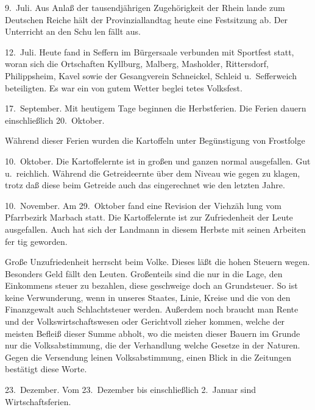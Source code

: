 

9.\ Juli.     Aus Anlaß der tausendjährigen Zugehörigkeit der Rhein\ohb
lande zum Deutschen Reiche hält der Provinziallandtag\ob
heute eine Festsitzung ab. Der Unterricht an den Schu\ohb
len fällt aus.

12.\ Juli.    Heute fand in Seffern im Bürgersaale verbunden mit\ob
Sportfest statt, woran sich die Ortschaften Kyllburg,\ob
Malberg, Masholder, Rittersdorf, Philippsheim, Kavel\unsicher{} sowie\ob
der Gesangverein Schneickel, Schleid u.\ Sefferweich\ob
beteiligten. Es war ein von gutem Wetter beglei\ohb
tetes Volksfest.

17.\ September. Mit heutigem Tage beginnen die Herbstferien.\ob
Die Ferien dauern einschließlich 20.\ Oktober.

Während dieser Ferien wurden die Kartoffeln\ob
unter Begünstigung\unsicher{} von Frostfolge\unsicher

10.\ Oktober. Die Kartoffelernte ist in großen und ganzen normal\ob
ausgefallen. Gut u.\ reichlich. Während die Getreideernte\ob
über dem\unsicher{} Niveau\unsicher{} wie gegen zu\ob
klagen, trotz daß diese beim Getreide auch\unsicher{} das\ob
\unsicher eingerechnet wie den letzten Jahre.

10.\ November. Am 29.\ Oktober fand eine Revision der Viehzäh\ohb
lung vom Pfarrbezirk Marbach statt.\ob
Die Kartoffelernte ist zur Zufriedenheit der Leute\ob
ausgefallen. Auch hat sich der Landmann\ob
in diesem Herbste\unsicher{} mit seinen Arbeiten fer\ohb
tig geworden.

Große Unzufriedenheit herrscht beim Volke. Dieses\ob
läßt die hohen Steuern wegen. Besonders Geld fällt den Leuten.\ob
Großenteils sind die nur in die Lage, den Einkommens\ohb
steuer zu bezahlen, diese geschweige doch an Grundsteuer.\ob
So ist keine Verwunderung, wenn in\unsicher{} unseres\ob
Staates, Linie, Kreise und die von den Finanzgewalt\ohb
auch Schlachtsteuer werden. Außerdem noch braucht man\ob
Rente und der Volkswirtschaftswesen oder Gerichtvoll\ohb
zieher kommen, welche der meisten Befleiß dieser\ob
Summe abholt, wo die meisten dieser Bauern im\ob
Grunde nur die Volksabstimmung, die der Verhandlung\ob
welche Gesetze in der Naturen. Gegen die Versendung\ob
leinen Volksabstimmung, einen Blick in die Zeitungen\ob
bestätigt diese Worte.

23.\ Dezember. Vom 23.\ Dezember bis einschließlich 2.\ Januar\ob
sind Wirtschaftsferien.
\pend
